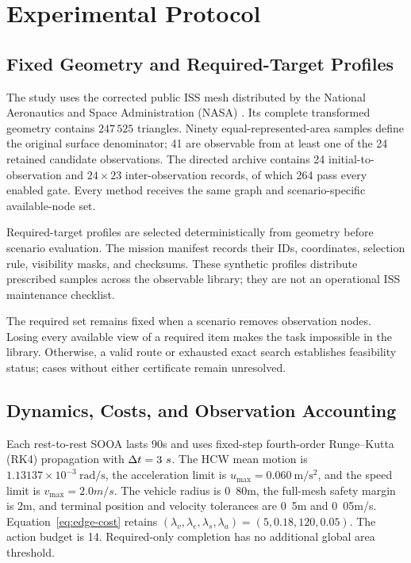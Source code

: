 
\section{Experimental Protocol}
\label{sec:simulation}

\subsection{Fixed Geometry and Required-Target Profiles}

The study uses the corrected public ISS mesh distributed by the National Aeronautics and Space Administration (NASA) \cite{nasa_iss_gltf_model}. Its complete transformed geometry contains $247\,525$ triangles. Ninety equal-represented-area samples define the original surface denominator; 41 are observable from at least one of the 24 retained candidate observations. The directed archive contains 24 initial-to-observation and $24\times23$ inter-observation records, of which 264 pass every enabled gate. Every method receives the same graph and scenario-specific available-node set.

Required-target profiles are selected deterministically from geometry before scenario evaluation. The mission manifest records their IDs, coordinates, selection rule, visibility masks, and checksums. These synthetic profiles distribute prescribed samples across the observable library; they are not an operational ISS maintenance checklist.



The required set remains fixed when a scenario removes observation nodes. Losing every available view of a required item makes the task impossible in the library. Otherwise, a valid route or exhausted exact search establishes feasibility status; cases without either certificate remain unresolved.

\subsection{Dynamics, Costs, and Observation Accounting}

Each rest-to-rest SOOA lasts \unit{90}{s} and uses fixed-step fourth-order Runge--Kutta (RK4) propagation with $\Delta t=3~s$. The HCW mean motion is $1.13137\times10^{-3}~\mathrm{rad/s}$, the acceleration limit is $u_{\max}=0.060~\mathrm{m/s^2}$, and the speed limit is $v_{\max}=\unit{2.0}{m/s}$. The vehicle radius is \unit{0.80}{m}, the full-mesh safety margin is \unit{2}{m}, and terminal position and velocity tolerances are \unit{0.5}{m} and \unit{0.05}{m/s}. Equation~\eqref{eq:edge-cost} retains $(\lambda_v,\lambda_e,\lambda_s,\lambda_a)=(5,0.18,120,0.05)$. The action budget is 14. Required-only completion has no additional global area threshold.

